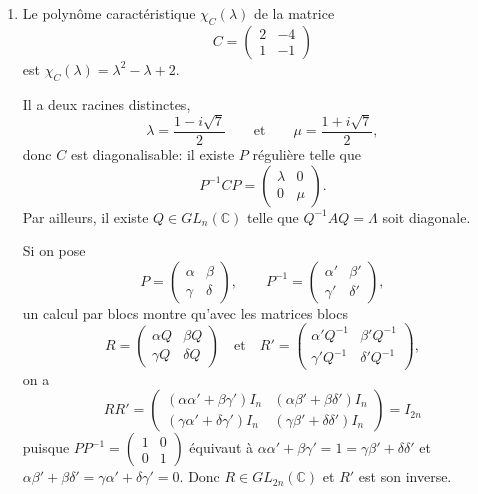 \begin{enumerate}[label=\arabic*.,leftmargin=2.2em,itemsep=1.1em]
\item Le polynôme caractéristique $\chi_C(\lambda)$ de la matrice
\[
C=\begin{pmatrix}2&-4\\1&-1\end{pmatrix}
\]
est $\chi_C(\lambda)=\lambda^2-\lambda+2$.

Il a deux racines distinctes,
\[
\lambda=\frac{1-i\sqrt7}{2}\qquad\text{et}\qquad
\mu=\frac{1+i\sqrt7}{2},
\]
donc $C$ est diagonalisable: il existe $P$ régulière telle que
\[
P^{-1}CP=\begin{pmatrix}\lambda&0\\0&\mu\end{pmatrix}.
\]
Par ailleurs, il existe $Q\in GL_n(\mathbb C)$ telle que $Q^{-1}AQ=\Lambda$ soit diagonale.

Si on pose
\[
P=\begin{pmatrix}\alpha&\beta\\\gamma&\delta\end{pmatrix},\qquad
P^{-1}=\begin{pmatrix}\alpha'&\beta'\\\gamma'&\delta'\end{pmatrix},
\]
un calcul par blocs montre qu'avec les matrices blocs
\[
R=\begin{pmatrix}\alpha Q&\beta Q\\\gamma Q&\delta Q\end{pmatrix}
\quad\text{et}\quad
R'=\begin{pmatrix}\alpha'Q^{-1}&\beta'Q^{-1}\\\gamma'Q^{-1}&\delta'Q^{-1}\end{pmatrix},
\]
on a
\[
RR'=\begin{pmatrix}
(\alpha\alpha'+\beta\gamma')I_n&(\alpha\beta'+\beta\delta')I_n\\
(\gamma\alpha'+\delta\gamma')I_n&(\gamma\beta'+\delta\delta')I_n
\end{pmatrix}=I_{2n}
\]
puisque $PP^{-1}=\begin{pmatrix}1&0\\0&1\end{pmatrix}$ équivaut à $\alpha\alpha'+\beta\gamma'=1=\gamma\beta'+\delta\delta'$ et $\alpha\beta'+\beta\delta'=\gamma\alpha'+\delta\gamma'=0$.
Donc $R\in GL_{2n}(\mathbb C)$ et $R'$ est son inverse.


\end{enumerate}
